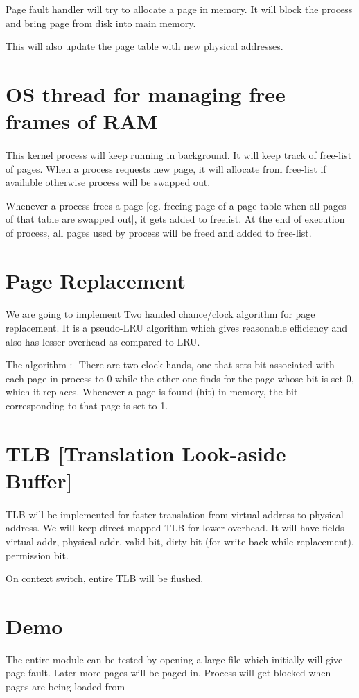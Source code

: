 \documentclass[11pt]{article}
\begin{document}
Page fault handler will try to allocate a page in memory. It will block the process and bring page from disk into main memory. 

This will also update the page table with new physical addresses.

\section{OS thread for managing free frames of RAM}
\paragraph{}
This kernel process will keep running in background. It will keep track of free-list of pages. When a process requests new page, it will allocate from free-list if available otherwise process will be swapped out.

	Whenever a process frees a page [eg. freeing page of a page table when all pages of that table are swapped out], it gets added to freelist.
At the end of execution of process, all pages used by process will be freed and added to free-list.


\section{Page Replacement}
\paragraph{}
We are going to implement Two handed chance/clock algorithm for page replacement. It is a pseudo-LRU algorithm which gives reasonable efficiency and also has lesser overhead as compared to LRU.

The algorithm :- There are two clock hands, one that sets bit associated with each page in process to 0 while the other one finds for the page whose bit is set 0, which it replaces. Whenever a page is found (hit) in memory, the bit corresponding to that page is set to 1. 

\section{TLB [Translation Look-aside Buffer]}
\paragraph{}
TLB will be implemented for faster translation from virtual address to physical address. We will keep direct mapped TLB for lower overhead. It will have fields - virtual addr, physical addr, valid bit, dirty bit (for write back while replacement), permission bit.

On context switch, entire TLB will be flushed.

\section {Demo}
The entire module can be tested by opening a large file which initially will give page fault. Later more pages will be paged in. Process will get blocked when pages are being loaded from 
\end{document}
